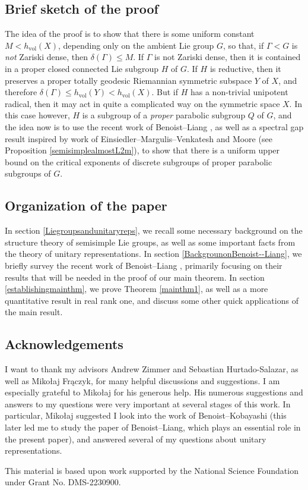 \documentclass[psamsfonts]{amsart}
\theoremstyle{definition}
\theoremstyle{remark}
\numberwithin{equation}{section}
\begin{document}
\subsection{Brief sketch of the proof}
\label{ideasofproof}
The idea of the proof is to show that there is some uniform constant $M < h_{\mathrm{vol}}(X)$, depending only on the ambient Lie group $G$, so that, if $\Gamma < G$ is \emph{not} Zariski dense, then $\delta(\Gamma) \leq M$. If $\Gamma$ is not Zariski dense, then it is contained in a proper closed connected Lie subgroup $H$ of $G$. If $H$ is reductive, then it preserves a proper totally geodesic Riemannian symmetric subspace $Y$ of $X$, and therefore $\delta(\Gamma) \leq h_{\mathrm{vol}}(Y) < h_{\mathrm{vol}}(X)$. But if $H$ has a non-trivial unipotent radical, then it may act in quite a complicated way on the symmetric space $X$. In this case however, $H$ is a subgroup of a \emph{proper} parabolic subgroup $Q$ of $G$, and the idea now is to use the recent work of Benoist--Liang \cite{BL}, as well as a spectral gap result inspired by work of Einsiedler--Margulis--Venkatesh \cite{EMV} and Moore \cite{Mo} (see Proposition \ref{semisimplealmostL2m}), to show that there is a uniform upper bound on the critical exponents of discrete subgroups of proper parabolic subgroups of $G$.
\subsection{Organization of the paper}
In section \ref{Liegroupsandunitaryreps}, we recall some necessary background on the structure theory of semisimple Lie groups, as well as some important facts from the theory of unitary representations. In section \ref{BackgrounonBenoist--Liang}, we briefly survey the recent work of Benoist--Liang \cite{BL}, primarily focusing on their results that will be needed in the proof of our main theorem. In section \ref{establishingmainthm}, we prove Theorem \ref{mainthm1}, as well as a more quantitative result in real rank one, and discuss some other quick applications of the main result.
\subsection*{Acknowledgements}
I want to thank my advisors Andrew Zimmer and Sebastian Hurtado-Salazar, as well as Mikołaj Frączyk, for many helpful discussions and suggestions. I am especially grateful to Mikołaj for his generous help. His numerous suggestions and answers to my questions were very important at several stages of this work. In particular, Mikołaj suggested I look into the work of Benoist--Kobayashi (this later led me to study the paper of Benoist--Liang, which plays an essential role in the present paper), and answered several of my questions about unitary representations. 
\par 
This material is based upon work supported by the National Science Foundation under Grant No. DMS-2230900.
\end{document}
